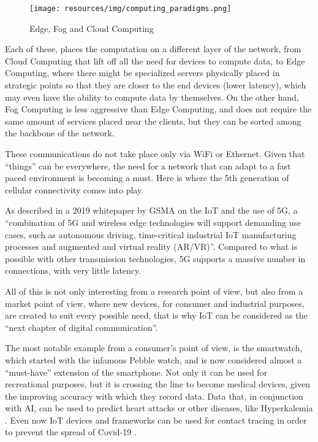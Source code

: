 		\begin{figure}[H]
			\centering
			\texttt{[image: resources/img/computing\_paradigms.png]}\\
			\caption{Edge, Fog and Cloud Computing}
			\label{computing_paradigms}
		\end{figure}
	
		Each of these, places the computation on a different layer of the network, from Cloud Computing that lift off all the need for devices to compute data, to Edge Computing, where there might be specialized servers physically placed in strategic points so that they are closer to the end devices (lower latency), which may even have the ability to compute data by themselves.
		On the other hand, Fog Computing is less aggressive than Edge Computing, and does not require the same amount of services placed near the clients, but they can be sorted among the backbone of the network.
		
		These communications do not take place only via WiFi or Ethernet.
		Given that ``things'' can be everywhere, the need for a network that can adapt to a fast paced environment is becoming a must.
		Here is where the 5th generation of cellular connectivity comes into play.
		
		As described in a 2019 whitepaper by GSMA on the IoT and the use of 5G, a ``combination of 5G and wireless edge technologies will support demanding  use cases, such as autonomous driving, time-critical industrial IoT manufacturing processes and  augmented and virtual reality (AR/VR)''\cite{IoT_5g_era}.
		Compared to what is possible with other transmission technologies, 5G supports a massive number in connections, with very little latency.
			
		All of this is not only interesting from a research point of view, but also from a market point of view, where new devices, for consumer and industrial purposes, are created to suit every possible need, that is why IoT can be considered as the ``next chapter of digital communication''.
		
		The most notable example from a consumer's point of view, is the smartwatch, which started with the infamous Pebble watch, and is now considered almost a ``must-have'' extension of the smartphone.
		Not only it can be used for recreational purposes, but it is crossing the line to become medical devices, given the improving accuracy with which they record data.
		Data that, in conjunction with AI, can be used to predict heart attacks \cite{7946780} or other diseases, like Hyperkalemia \cite{HYPERKALEMIA}.
		Even now IoT devices and frameworks can be used for contact tracing in order to prevent the spread of Covid-19 \cite{9181512}.
		
